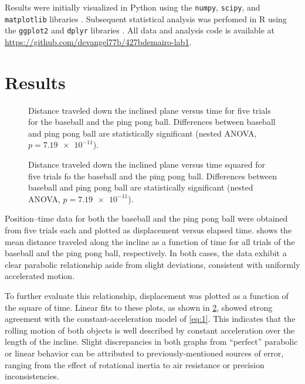 \documentclass[reprint,amsmath,amssymb,aps,twoside]{revtex4-2}
\begin{document}
Results were initially visualized in Python using the \texttt{numpy}, \texttt{scipy}, and \texttt{matplotlib} libraries \cite{numpy,scipy,matplotlib}. Subsequent statistical analysis \cite{starnes:2015:practice} was perfomed in R \cite{R} using the \texttt{ggplot2} and \texttt{dplyr} libraries \cite{ggplot2,dplyr}. All data and analysis code is available at \url{https://github.com/devangel77b/427bdemairo-lab1}. 




\section{Results}
\begin{figure}
\begin{center}

\end{center}
\caption{Distance traveled down the inclined plane versus time for five trials for the baseball and the ping pong ball. Differences between baseball and ping pong ball are statistically significant (nested ANOVA, $p=\num{7.19e-11}$).}
\label{fig:21}
\end{figure}
\begin{figure}
\begin{center}

\end{center}
\caption{Distance traveled down the inclined plane versus time squared for five trials fo the baseball and the ping pong ball. Differences between baseball and ping pong ball are statistically significant (nested ANOVA, $p=\num{7.19e-11}$).}
\label{fig:22}
\end{figure}

Position–time data for both the baseball and the ping pong ball were obtained from five trials each and plotted as displacement versus elapsed time.  shows the mean distance traveled along the incline as a function of time for all trials of the baseball and the ping pong ball, respectively. In both cases, the data exhibit a clear parabolic relationship aside from slight deviations, consistent with uniformly accelerated motion. 

To further evaluate this relationship, displacement was plotted as a function of the square of time. Linear fits to these plots, as shown in \cref{fig:22}, showed strong agreement with the constant-acceleration model of \cref{eq:1}. This indicates that the rolling motion of both objects is well described by constant acceleration over the length of the incline. Slight discrepancies in both graphs from ``perfect'' parabolic or linear behavior can be attributed to previously-mentioned sources of error, ranging from the effect of rotational inertia to air resistance or precision inconsistencies.
\end{document}
